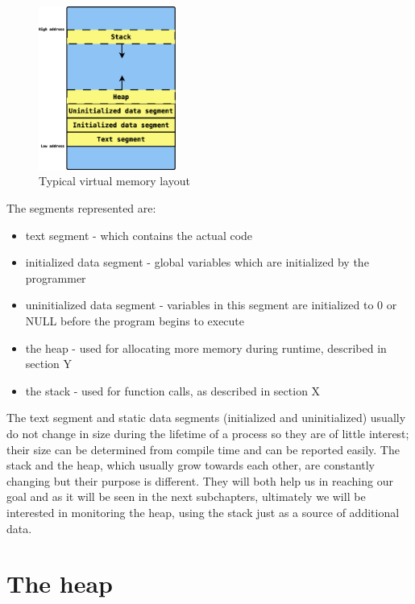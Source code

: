 \begin{figure}[htb]
\centering
\includegraphics[width=0.4\textwidth]{src/img/virtmemlayout}
\caption{Typical virtual memory layout}
\label{fig:virtmemlayout}
\end{figure}

The segments represented are:
\begin{itemize}
\item text segment - which contains the actual code
\item initialized data segment - global variables which are initialized by the programmer
\item uninitialized data segment - variables in this segment are initialized to 0 or NULL before the program begins to execute
\item the heap - used for allocating more memory during runtime, described in section Y
\item the stack - used for function calls, as described in section X
\end{itemize}

The text segment and static data segments (initialized and uninitialized) usually do not change in size during the lifetime of a process so they are of little interest; their size can be determined from compile time and can be reported easily. The stack and the heap, which usually grow towards each other, are constantly changing but their purpose is different. They will both help us in reaching our goal and as it will be seen in the next subchapters, ultimately we will be interested in monitoring the heap, using the stack just as a source of additional data.

\section{The heap}
\label{section:heap}

